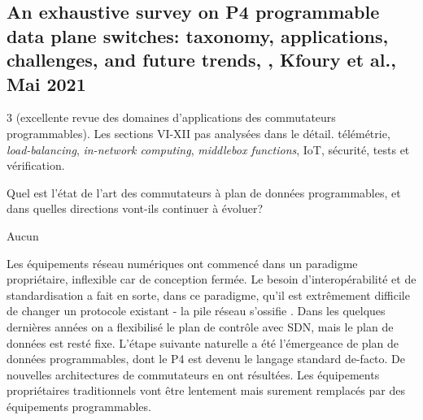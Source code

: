 
\subsection{An exhaustive survey on P4 programmable data plane switches: taxonomy, applications, challenges, and future trends, \cite{kfoury_exhaustive_2021}, Kfoury et al., Mai 2021}
 3 (excellente revue des domaines d'applications des commutateurs programmables). Les sections VI-XII pas analysées dans le détail.
 télémétrie, \emph{load-balancing}, \emph{in-network computing}, \emph{middlebox functions}, IoT, sécurité, tests et vérification.

 Quel est l'état de l'art des commutateurs à plan de données programmables, et dans quelles directions vont-ils continuer à évoluer?

 Aucun

 Les équipements réseau numériques ont commencé dans un paradigme propriétaire, inflexible car de conception fermée. Le besoin d'interopérabilité et de standardisation a fait en sorte, dans ce paradigme, qu'il est extrêmement difficile de changer un protocole existant - la pile réseau s'\og ossifie \fg. Dans les quelques dernières années on a flexibilisé le plan de contrôle avec SDN, mais le plan de données est resté fixe. L'étape suivante naturelle a été l'émergeance de plan de données programmables, dont le P4 est devenu le langage standard de-facto. De nouvelles architectures de commutateurs en ont résultées. Les équipements propriétaires traditionnels vont être lentement mais surement remplacés par des équipements programmables.


